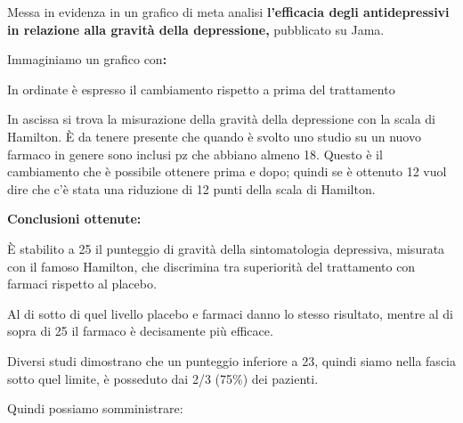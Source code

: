 \documentclass[]{article}
\begin{document}
Messa in evidenza in un grafico di meta analisi \textbf{l'efficacia
degli antidepressivi in relazione alla gravità della depressione,}
pubblicato su Jama.

Immaginiamo un grafico con\textbf{:}

In ordinate è espresso il cambiamento rispetto a prima del trattamento

In ascissa si trova la misurazione della gravità della depressione con
la scala di Hamilton. È da tenere presente che quando è svolto uno
studio su un nuovo farmaco in genere sono inclusi pz che abbiano almeno
18. Questo è il cambiamento che è possibile ottenere prima e dopo;
quindi se è ottenuto 12 vuol dire che c'è stata una riduzione di 12
punti della scala di Hamilton.

\textbf{Conclusioni ottenute:}

È stabilito a 25 il punteggio di gravità della sintomatologia
depressiva, misurata con il famoso Hamilton, che discrimina tra
superiorità del trattamento con farmaci rispetto al placebo.

Al di sotto di quel livello placebo e farmaci danno lo stesso risultato,
mentre al di sopra di 25 il farmaco è decisamente più efficace.

Diversi studi dimostrano che un punteggio inferiore a 23, quindi siamo
nella fascia sotto quel limite, è posseduto dai 2/3 (75\%) dei pazienti.

Quindi possiamo somministrare:
\end{document}
